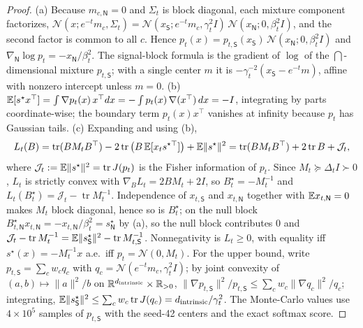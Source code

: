 \begin{proof}
(a) Because $m_{c,\mathsf N}=0$ and $\Sigma_t$ is block diagonal, each mixture component factorizes, $\mathcal N(x;e^{-t}m_c,\Sigma_t)=\mathcal N(x_{\mathsf S};e^{-t}m_c,\gamma_t^2 I)\,\mathcal N(x_{\mathsf N};0,\beta_t^2 I)$, and the second factor is common to all $c$. Hence $p_t(x)=p_{t,\mathsf S}(x_{\mathsf S})\,\mathcal N(x_{\mathsf N};0,\beta_t^2I)$ and $\nabla_{\mathsf N}\log p_t=-x_{\mathsf N}/\beta_t^2$. The signal-block formula is the gradient of $\log$ of the $\dint$-dimensional mixture $p_{t,\mathsf S}$; with a single center $m$ it is $-\gamma_t^{-2}(x_{\mathsf S}-e^{-t}m)$, affine with nonzero intercept unless $m=0$.
(b) $\mathbb{E}[s^\star x^{\top}]=\int\nabla p_t(x)\,x^{\top}dx=-\int p_t(x)\,\nabla(x^{\top})\,dx=-I$, integrating by parts coordinate-wise; the boundary term $p_t(x)x^{\top}$ vanishes at infinity because $p_t$ has Gaussian tails.
(c) Expanding and using (b),
\[
L_t(B)=\operatorname{tr}(BM_tB^{\top})-2\operatorname{tr}\big(B\,\mathbb{E}[x_ts^{\star\top}]\big)+\mathbb{E}\|s^\star\|^2=\operatorname{tr}(BM_tB^{\top})+2\operatorname{tr}B+\mathcal J_t,
\]
where $\mathcal J_t:=\mathbb{E}\|s^\star\|^2=\operatorname{tr}J(p_t)$ is the Fisher information of $p_t$. Since $M_t\succeq\Delta_tI\succ0$, $L_t$ is strictly convex with $\nabla_BL_t=2BM_t+2I$, so $B^\star_t=-M_t^{-1}$ and $L_t(B^\star_t)=\mathcal J_t-\operatorname{tr}M_t^{-1}$. Independence of $x_{t,\mathsf S}$ and $x_{t,\mathsf N}$ together with $\mathbb{E} x_{t,\mathsf N}=0$ makes $M_t$ block diagonal, hence so is $B^\star_t$; on the null block $B^\star_{t,\mathsf N}x_{t,\mathsf N}=-x_{t,\mathsf N}/\beta_t^2=s^\star_{\mathsf N}$ by (a), so the null block contributes $0$ and $\mathcal J_t-\operatorname{tr}M_t^{-1}=\mathbb{E}\|s^\star_{\mathsf S}\|^2-\operatorname{tr}M_{t,\mathsf S}^{-1}$. Nonnegativity is $L_t\ge0$, with equality iff $s^\star(x)=-M_t^{-1}x$ a.e.\ iff $p_t=\mathcal N(0,M_t)$. For the upper bound, write $p_{t,\mathsf S}=\sum_cw_cq_c$ with $q_c=\mathcal N(e^{-t}m_c,\gamma_t^2I)$; by joint convexity of $(a,b)\mapsto\|a\|^2/b$ on $\mathbb{R}^{d_{\mathrm{intrinsic}}}\times\mathbb{R}_{>0}$, $\|\nabla p_{t,\mathsf S}\|^2/p_{t,\mathsf S}\le\sum_cw_c\|\nabla q_c\|^2/q_c$; integrating, $\mathbb{E}\|s^\star_{\mathsf S}\|^2\le\sum_cw_c\operatorname{tr}J(q_c)=d_{\mathrm{intrinsic}}/\gamma_t^2$. The Monte-Carlo values use $4\times10^5$ samples of $p_{t,\mathsf S}$ with the seed-42 centers and the exact softmax score.
\end{proof}

